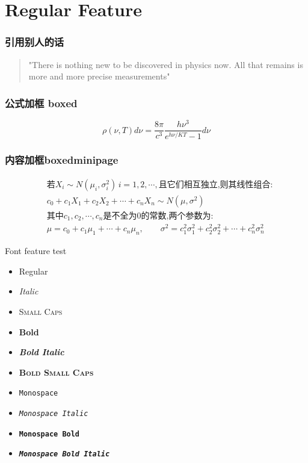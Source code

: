 
\section{Regular Feature}

\begin{frame}
  \frametitle{引用别人的话}
  \begin{quotation}
    "There is nothing new to be discovered in physics now. All that remains is 
    more and more precise measurements"   \\
\end{quotation}  
\end{frame}

\begin{frame}
  \frametitle{公式加框 boxed}
  \begin{equation}
    \boxed{\rho(\nu, T) d \nu=\frac{8 \pi}{c^{3}} \frac{h \nu^{3}}{e^{h \nu / K T}-1} d \nu}
  \end{equation}
\end{frame}

\begin{frame}
  \frametitle{内容加框boxedminipage}
  \begin{boxedminipage}{0.9\linewidth}
    \[\begin{aligned}
    & \text{若}X_i\sim N(\mu_i,\sigma_i^2)\, i=1,2,\cdots,\text{且它们相互独立,则其线性组合:}\\
    & c_0+c_1X_1+c_2X_2+\cdots+c_nX_n\sim N(\mu,\sigma^2)\\
    & \text{其中}c_1,c_2,\cdots,c_n \text{是不全为0的常数,两个参数为:}\\
    & \mu=c_0+c_1\mu_1+\cdots+c_n\mu_n,\qquad \sigma^2=c_1^2\sigma_1^2+c_2^2\sigma_2^2+\cdots+c_n^2\sigma_n^2
    \end{aligned}\]
    \vspace{2pt}
    \end{boxedminipage}
\end{frame}

\begin{frame}{Font feature test}
  \begin{itemize}
    \item Regular
    \item \textit{Italic}
    \item \textsc{Small Caps}
    \item \textbf{Bold}
    \item \textbf{\textit{Bold Italic}}
    \item \textbf{\textsc{Bold Small Caps}}
    \item \texttt{Monospace}
    \item \texttt{\textit{Monospace Italic}}
    \item \texttt{\textbf{Monospace Bold}}
    \item \texttt{\textbf{\textit{Monospace Bold Italic}}}
  \end{itemize}
\end{frame}

